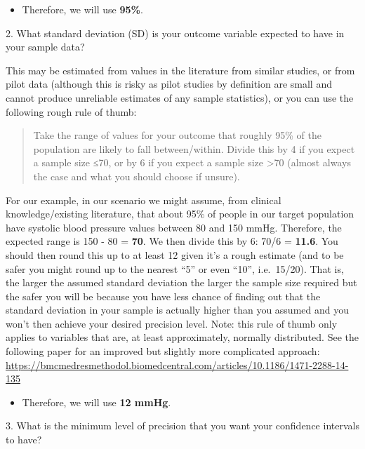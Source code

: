 \documentclass[
]{book}
\providecommand{\tightlist}{%
  \setlength{\itemsep}{0pt}\setlength{\parskip}{0pt}}
\begin{document}
\begin{itemize}
\tightlist
\item
  Therefore, we will use \textbf{95\%}.
\end{itemize}

2. What standard deviation (SD) is your outcome variable expected to have in your sample data?

This may be estimated from values in the literature from similar studies, or from pilot data (although this is risky as pilot studies by definition are small and cannot produce unreliable estimates of any sample statistics), or you can use the following rough rule of thumb:

\begin{quote}
Take the range of values for your outcome that roughly 95\% of the population are likely to fall between/within. Divide this by 4 if you expect a sample size ≤70, or by 6 if you expect a sample size \textgreater70 (almost always the case and what you should choose if unsure).
\end{quote}

For our example, in our scenario we might assume, from clinical knowledge/existing literature, that about 95\% of people in our target population have systolic blood pressure values between 80 and 150 mmHg. Therefore, the expected range is 150 - 80 = \textbf{70}. We then divide this by 6: 70/6 = \textbf{11.6}. You should then round this up to at least 12 given it's a rough estimate (and to be safer you might round up to the nearest ``5'' or even ``10'', i.e.~15/20). That is, the larger the assumed standard deviation the larger the sample size required but the safer you will be because you have less chance of finding out that the standard deviation in your sample is actually higher than you assumed and you won't then achieve your desired precision level. Note: this rule of thumb only applies to variables that are, at least approximately, normally distributed. See the following paper for an improved but slightly more complicated approach: \url{https://bmcmedresmethodol.biomedcentral.com/articles/10.1186/1471-2288-14-135}

\begin{itemize}
\tightlist
\item
  Therefore, we will use \textbf{12 mmHg}.
\end{itemize}

3. What is the minimum level of precision that you want your confidence intervals to have?
\end{document}
